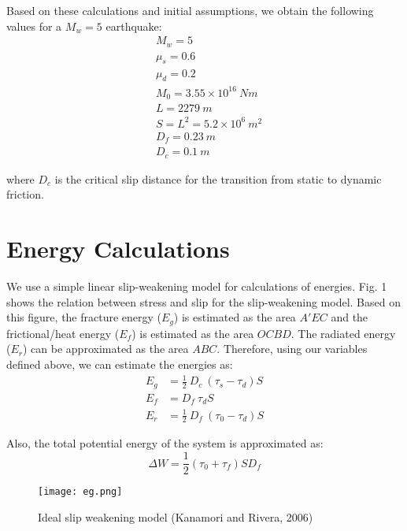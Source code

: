 \documentclass[11pt]{article}
\begin{document}
Based on these calculations and initial assumptions, we obtain the following values for a $M_w = 5$ earthquake:
\begin{equation}
    \begin{aligned}
        &M_w = 5 \\
        &\mu_s = 0.6 \\
        &\mu_d = 0.2 \\
        &M_0 = 3.55 \times 10^{16}\ Nm \\
        &L = 2279\ m \\
        &S = L^2 = 5.2 \times 10^6\ m^2 \\
        &D_f = 0.23\ m \\
        &D_c = 0.1\ m
    \end{aligned}
\end{equation}

where $D_c$ is the critical slip distance for the transition from static to dynamic friction.

\section*{Energy Calculations}
We use a simple linear slip-weakening model for calculations of energies. Fig. 1 shows the relation between stress and slip for the slip-weakening model. Based on this figure, the fracture energy ($E_g$) is estimated as the area $A'EC$ and the frictional/heat energy ($E_f$) is estimated as the area $OCBD$. The radiated energy ($E_r$) can be approximated as the area $ABC$. Therefore, using our variables defined above, we can estimate the energies as:
\begin{equation}
    \begin{aligned}
        E_g &= \frac{1}{2}\ D_c\ (\tau_s - \tau_d) S \\
        E_f &= D_f\ \tau_d S \\
        E_r &= \frac{1}{2}\ D_f\ (\tau_0 - \tau_d) S
    \end{aligned}
\end{equation}

Also, the total potential energy of the system is approximated as:
\begin{equation}
    \Delta W = \frac{1}{2}(\tau_0 + \tau_f) S D_f
\end{equation}

\begin{figure}[!htb]
    \centering
    \texttt{[image: eg.png]}
    \caption{Ideal slip weakening model (Kanamori and Rivera, 2006)}
\end{figure}
\end{document}
